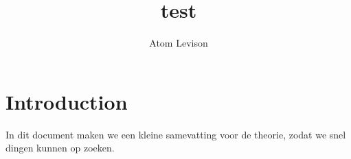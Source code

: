 \documentclass{article}
\title{test}
\author{Atom Levison}
\date{\date}
\begin{document}
\maketitle

\section{Introduction}
In dit document maken we een kleine samevatting voor de theorie, zodat we snel dingen kunnen op zoeken.
\end{document}
